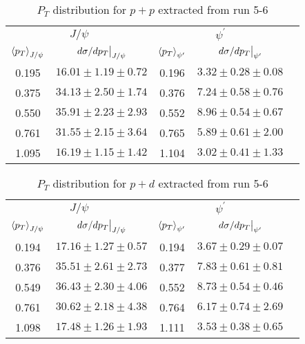 \documentclass[../main.tex]{subfiles}
\begin{document}
\begin{table}[h!]
\centering
\caption{$P_T$ distribution for $p+p$ extracted from run 5-6}
\begin{tabular}{cc|ccc}
\multicolumn{2}{c|}{$J/\psi$}                               & \multicolumn{2}{c}{$\psi^{\prime}$}                                &  \\ \cline{1-4}
$\expval{p_T}_{J/\psi}$    & $\eval{d\sigma/dp_T}_{J/\psi}$ & $\expval{p_T}_{\psi^\prime}$ & $\eval{d\sigma/dp_T}_{\psi^\prime}$ &  \\ \cline{1-4}
\multicolumn{1}{c|}{0.195} & $16.01\pm1.19\pm0.72$          & \multicolumn{1}{c|}{0.196}   & $3.32\pm0.28\pm0.08$                &  \\
\multicolumn{1}{c|}{0.375} & $34.13\pm2.50\pm1.74$          & \multicolumn{1}{c|}{0.376}   & $7.24\pm0.58\pm0.76$                &  \\
\multicolumn{1}{c|}{0.550} & $35.91\pm2.23\pm2.93$          & \multicolumn{1}{c|}{0.552}   & $8.96\pm0.54\pm0.67$                &  \\
\multicolumn{1}{c|}{0.761} & $31.55\pm2.15\pm3.64$          & \multicolumn{1}{c|}{0.765}   & $5.89\pm0.61\pm2.00$                &  \\
\multicolumn{1}{c|}{1.095} & $16.19\pm1.15\pm1.42$          & \multicolumn{1}{c|}{1.104}   & $3.02\pm0.41\pm1.33$                &  \\ \cline{1-4}
\end{tabular}
\end{table}
\begin{table}[h!]
\centering
\caption{$P_T$ distribution for $p+d$ extracted from run 5-6}
\begin{tabular}{cc|ccc}
\multicolumn{2}{c|}{$J/\psi$}                               & \multicolumn{2}{c}{$\psi^{\prime}$}                                &  \\ \cline{1-4}
$\expval{p_T}_{J/\psi}$    & $\eval{d\sigma/dp_T}_{J/\psi}$ & $\expval{p_T}_{\psi^\prime}$ & $\eval{d\sigma/dp_T}_{\psi^\prime}$ &  \\ \cline{1-4}
\multicolumn{1}{c|}{0.194} & $17.16\pm1.27\pm0.57$          & \multicolumn{1}{c|}{0.194}   & $3.67\pm0.29\pm0.07$                &  \\
\multicolumn{1}{c|}{0.376} & $35.51\pm2.61\pm2.73$          & \multicolumn{1}{c|}{0.377}   & $7.83\pm0.61\pm0.81$                &  \\
\multicolumn{1}{c|}{0.549} & $36.43\pm2.30\pm4.06$          & \multicolumn{1}{c|}{0.552}   & $8.73\pm0.54\pm0.46$                &  \\
\multicolumn{1}{c|}{0.761} & $30.62\pm2.18\pm4.38$          & \multicolumn{1}{c|}{0.764}   & $6.17\pm0.74\pm2.69$                &  \\
\multicolumn{1}{c|}{1.098} & $17.48\pm1.26\pm1.93$          & \multicolumn{1}{c|}{1.111}   & $3.53\pm0.38\pm0.65$                &  \\ \cline{1-4}
\end{tabular}
\end{table}
\end{document}
